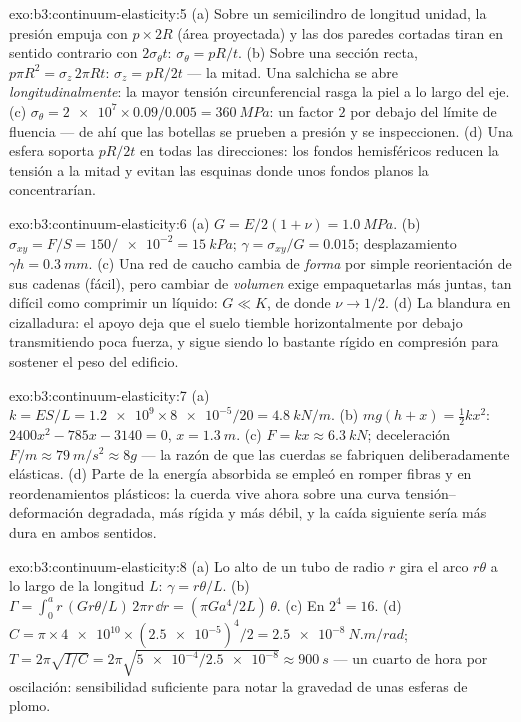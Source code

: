 \begin{solution}{exo:b3:continuum-elasticity:5}
(a) Sobre un semicilindro de longitud unidad, la presión empuja con $p
\times 2R$ (área proyectada) y las dos paredes cortadas tiran en sentido
contrario con $2\sigma_\theta t$: $\sigma_\theta = pR/t$. (b) Sobre una
sección recta, $p\pi R^2 = \sigma_z\,2\pi Rt$: $\sigma_z = pR/2t$ --- la
mitad. Una salchicha se abre \emph{longitudinalmente}: la mayor tensión
circunferencial rasga la piel a lo largo del eje. (c) $\sigma_\theta = \num{2e7} \times
0.09/0.005 = \qty{360}{MPa}$: un factor $2$ por debajo del
límite de fluencia --- de ahí que las botellas se prueben a presión y se
inspeccionen. (d) Una esfera soporta $pR/2t$ en todas las direcciones: los
fondos hemisféricos reducen la tensión a la mitad y evitan las esquinas
donde unos fondos planos la concentrarían.
\end{solution}

\begin{solution}{exo:b3:continuum-elasticity:6}
(a) $G = E/2(1 + \nu) = \qty{1.0}{MPa}$. (b) $\sigma_{xy} = F/S =
150/\num{e-2} = \qty{15}{kPa}$; $\gamma = \sigma_{xy}/G = 0.015$;
desplazamiento $\gamma h = \qty{0.3}{mm}$. (c) Una red de caucho cambia de
\emph{forma} por simple reorientación de sus cadenas (fácil), pero cambiar
de \emph{volumen} exige empaquetarlas más juntas, tan difícil como
comprimir un líquido: $G \ll K$, de donde $\nu \to 1/2$. (d) La blandura en
cizalladura: el apoyo deja que el suelo tiemble horizontalmente por debajo
transmitiendo poca fuerza, y sigue siendo lo bastante rígido en compresión
para sostener el peso del edificio.
\end{solution}

\begin{solution}{exo:b3:continuum-elasticity:7}
(a) $k = ES/L = \num{1.2e9} \times \num{8e-5}/20 = \qty{4.8}{kN/m}$.
(b) $mg(h + x) = \tfrac12 kx^2$: $2400x^2 - 785x - 3140 = 0$, $x =
\qty{1.3}{m}$. (c) $F = kx \approx \qty{6.3}{kN}$; deceleración $F/m
\approx \qty{79}{m/s^2} \approx 8g$ --- la razón de que las cuerdas se
fabriquen deliberadamente elásticas. (d) Parte de la energía absorbida se
empleó en romper fibras y en reordenamientos plásticos: la cuerda vive
ahora sobre una curva tensión--deformación degradada, más rígida y más
débil, y la caída siguiente sería más dura en ambos sentidos.
\end{solution}

\begin{solution}{exo:b3:continuum-elasticity:8}
(a) Lo alto de un tubo de radio $r$ gira el arco $r\theta$ a lo largo de
la longitud $L$: $\gamma = r\theta/L$. (b) $\Gamma = \int_0^a r\,(G r\theta/L)\,
2\pi r\,\dd r = (\pi Ga^4/2L)\,\theta$. (c) En $2^4 = 16$. (d) $C =
\pi \times \num{4e10} \times (\num{2.5e-5})^4/2 =
\qty{2.5e-8}{N.m/rad}$; $T = 2\pi\sqrt{I/C} = 2\pi\sqrt{\num{5e-4}/
\num{2.5e-8}} \approx \qty{900}{s}$ --- un cuarto de hora por
oscilación: sensibilidad suficiente para notar la gravedad de unas esferas
de plomo.
\end{solution}

